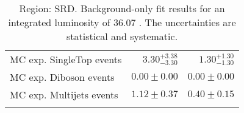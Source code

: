 \begin{table}
\begin{center}
{\begin{tabular*}{\textwidth}{@{\extracolsep{\fill}}lrr}
        MC exp. SingleTop events         & $3.30_{-3.30}^{+3.38}$          & $1.30_{-1.30}^{+1.30}$              \\
        MC exp. Diboson events         & $0.00 \pm 0.00$          & $0.00 \pm 0.00$              \\
        MC exp. Multijets events         & $1.12 \pm 0.37$          & $0.40 \pm 0.15$              \\
\noalign{\smallskip}\hline\noalign{\smallskip}
\end{tabular*}
}
\end{center}
\caption{Region: SRD. Background-only fit results for an integrated luminosity of 36.07 \ifb. The uncertainties are statistical and systematic.
}
\label{table.bkgonly.SRD}
\end{table}
%